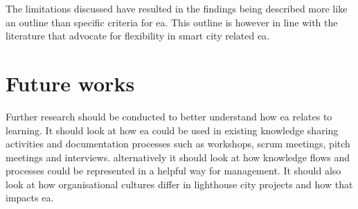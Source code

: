 The limitations discussed have resulted in the findings being described more like an outline than specific criteria for \gls{ea}. This outline is however in line with the literature that advocate for flexibility in smart city related \gls{ea}.

\section{Future works}

Further research should be conducted to better understand how \gls{ea} relates to learning. 
It should look at how \gls{ea} could be used in existing knowledge sharing activities and documentation processes such as workshops, scrum meetings, pitch meetings and interviews.
alternatively it should look at how knowledge flows and processes could be represented in a helpful way for management. 
It should also look at how organisational cultures differ in lighthouse city projects and how that impacts \gls{ea}.